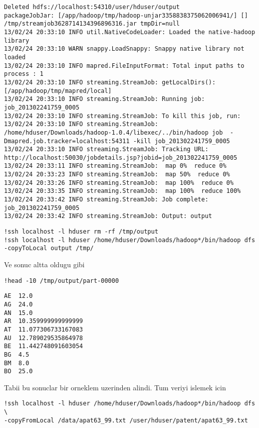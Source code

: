 \documentclass[12pt,fleqn]{article}\usepackage{../common}
\begin{document}
\begin{verbatim}
Deleted hdfs://localhost:54310/user/hduser/output
packageJobJar: [/app/hadoop/tmp/hadoop-unjar3358838375062006941/] [] /tmp/streamjob3628714134396896316.jar tmpDir=null
13/02/24 20:33:10 INFO util.NativeCodeLoader: Loaded the native-hadoop library
13/02/24 20:33:10 WARN snappy.LoadSnappy: Snappy native library not loaded
13/02/24 20:33:10 INFO mapred.FileInputFormat: Total input paths to process : 1
13/02/24 20:33:10 INFO streaming.StreamJob: getLocalDirs(): [/app/hadoop/tmp/mapred/local]
13/02/24 20:33:10 INFO streaming.StreamJob: Running job: job_201302241759_0005
13/02/24 20:33:10 INFO streaming.StreamJob: To kill this job, run:
13/02/24 20:33:10 INFO streaming.StreamJob: /home/hduser/Downloads/hadoop-1.0.4/libexec/../bin/hadoop job  -Dmapred.job.tracker=localhost:54311 -kill job_201302241759_0005
13/02/24 20:33:10 INFO streaming.StreamJob: Tracking URL: http://localhost:50030/jobdetails.jsp?jobid=job_201302241759_0005
13/02/24 20:33:11 INFO streaming.StreamJob:  map 0%  reduce 0%
13/02/24 20:33:23 INFO streaming.StreamJob:  map 50%  reduce 0%
13/02/24 20:33:26 INFO streaming.StreamJob:  map 100%  reduce 0%
13/02/24 20:33:35 INFO streaming.StreamJob:  map 100%  reduce 100%
13/02/24 20:33:42 INFO streaming.StreamJob: Job complete: job_201302241759_0005
13/02/24 20:33:42 INFO streaming.StreamJob: Output: output
\end{verbatim}

\begin{verbatim}
!ssh localhost -l hduser rm -rf /tmp/output
!ssh localhost -l hduser /home/hduser/Downloads/hadoop*/bin/hadoop dfs  -copyToLocal output /tmp/
\end{verbatim}

Ve sonuc altta oldugu gibi

\begin{verbatim}
!head -10 /tmp/output/part-00000
\end{verbatim}

\begin{verbatim}
AE	12.0
AG	24.0
AN	15.0
AR	10.359999999999999
AT	11.077306733167083
AU	12.789029535864978
BE	11.442748091603054
BG	4.5
BM	8.0
BO	25.0
\end{verbatim}

Tabii bu sonuclar bir orneklem uzerinden alindi. Tum veriyi islemek icin

\begin{verbatim}
!ssh localhost -l hduser /home/hduser/Downloads/hadoop*/bin/hadoop dfs \
-copyFromLocal /data/apat63_99.txt /user/hduser/patent/apat63_99.txt
\end{verbatim}
\end{document}
